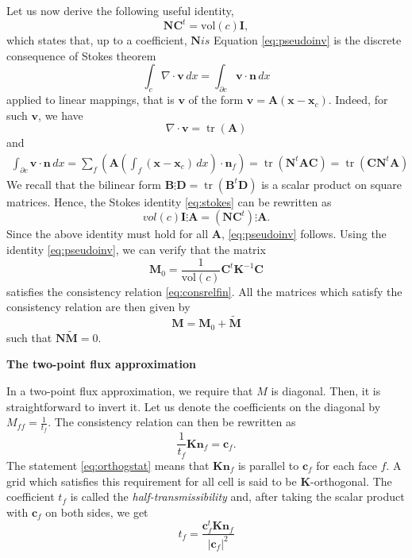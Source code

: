 \documentclass[11pt]{amsart}
\newcommand{\vect}[1]{\boldsymbol{#1}}
\newcommand{\mat}[1]{\boldsymbol{#1}}
\DeclareMathOperator{\tr}{tr}
\newcommand{\dive}{\nabla\cdot}
\newcommand{\abs}[1]{\left| #1\right|}
\newcommand{\id}{\mat{I}}
\begin{document}
Let us now derive the following useful identity,
\begin{equation}
  \label{eq:pseudoinv}
  \mat{N}\mat{C}^t = \text{vol}(c)\id,
\end{equation}
which states that, up to a coefficient,  $\mat{N} is $
Equation \eqref{eq:pseudoinv} is the discrete consequence of Stokes theorem
\begin{equation}
  \label{eq:stokes}
  \int_{c}\dive \vect{v}\,dx = \int_{\partial c}\vect{v}\cdot\vect{n}\,dx
\end{equation}
applied to linear mappings, that is $\vect{v}$ of the form $\vect{v}= \mat{A}(\vect{x} - \vect{x}_c)$. Indeed, for
such $\vect{v}$, we have
\begin{equation}
  \label{eq:divetrA}
  \dive\vect{v} =\tr(\mat{A})
\end{equation}
and
\begin{align*}
  \int_{\partial c}\vect{v}\cdot\vect{n}\,dx = \sum_{f}(\mat{A}(\int_{f}(\vect{x} - \vect{x}_c)\,dx)\cdot\vect{n}_f) = \tr(\mat{N}^t\mat{A}\mat{C}) = \tr(\mat{C}\mat{N}^t\mat{A})
\end{align*}
We recall that the bilinear form $\mat{B}\vdots\mat{D} = \tr(\mat{B}^t\mat{D})$ is a scalar product
on square matrices. Hence, the Stokes identity \eqref{eq:stokes} can be rewritten as
\begin{equation*}
  vol(c)\id\vdots\mat{A} = (\mat{N}\mat{C}^t)\vdots\mat{A}.
\end{equation*}
Since the above identity must hold for all $\mat{A}$, \eqref{eq:pseudoinv} follows. Using the
identity \eqref{eq:pseudoinv}, we can verify that the matrix
\begin{equation*}
  \mat{M}_0 = \frac{1}{\text{vol}(c)}\mat{C}^t\mat{K}^{-1}\mat{C}
\end{equation*}
satisfies the consistency relation \eqref{eq:consrelfin}. All the matrices which satisfy the
consistency relation are then given by
\begin{equation}
  \label{eq:genexpM}
  \mat{M} = \mat{M}_0 + \tilde{\mat{M}}
\end{equation}
such that $\mat{N}\tilde{\mat{M}}=0$.

\textbf{The two-point flux approximation}

In a two-point flux approximation, we require that $M$ is diagonal. Then, it is straightforward to
invert it. Let us denote the coefficients on the diagonal by $M_{ff}=\frac{1}{t_f}$. The consistency
relation can then be rewritten as
\begin{equation}
  \label{eq:orthogstat}
  \frac{1}{t_f}\mat{K}\vect{n}_f = \vect{c}_f.
\end{equation}
The statement \eqref{eq:orthogstat} means that $\mat{K}\vect{n}_f$ is parallel to $\vect{c}_f$ for
each face $f$. A grid which satisfies this requirement for all cell is said to be
$\mat{K}$-orthogonal. The coefficient $t_f$ is called the \textit{half-transmissibility} and, after
taking the scalar product with $\vect{c}_f$ on both sides, we get
\begin{equation}
  \label{eq:deftf}
  t_f = \frac{\vect{c}_f^t\mat{K}\vect{n}_f}{\abs{\vect{c}_f}^2}
\end{equation}
\end{document}
